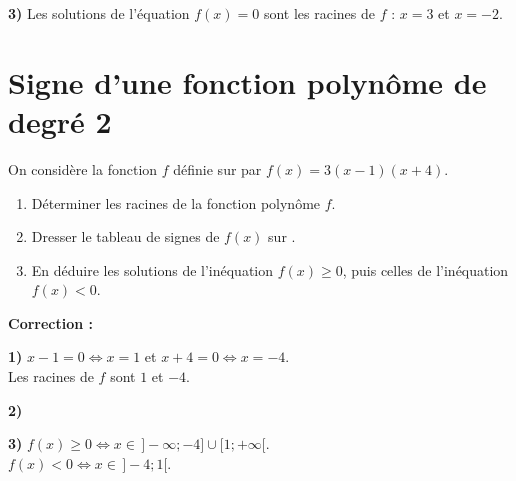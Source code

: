 \documentclass[11pt,a4paper]{book}
\begin{document}
\medskip
\begin{corrBox}
	\textbf{3)} Les solutions de l'équation $f(x)=0$ sont les racines de $f$ : $x=3$ et $x=-2$.
\end{corrBox}

\section*{\color{green!55!black}Signe d'une fonction polynôme de degré 2}

\exerciceDS{}

On considère la fonction $f$ définie sur \R par $f(x)=3(x-1)(x+4)$.

\begin{enumerate}[label=\textbf{\arabic*)}]
	\item Déterminer les racines de la fonction polynôme $f$.
	\item Dresser le tableau de signes de $f(x)$ sur \R.
	\item En déduire les solutions de l'inéquation $f(x)\geq 0$, puis celles de l'inéquation $f(x)<0$.
\end{enumerate}

\medskip
\noindent\textbf{\color{red!75!black}Correction :}

\smallskip
\begin{corrBox}
	\textbf{1)} $x-1=0 \iff x=1$ \quad et \quad $x+4=0 \iff x=-4$.\\
	Les racines de $f$ sont $1$ et $-4$.
\end{corrBox}

\medskip
\begin{corrBox}
	\textbf{2)}
	\begin{center}
	\end{center}
\end{corrBox}

\medskip
\begin{corrBox}
	\textbf{3)} $f(x)\geq0 \iff x\in\,]-\infty ; -4]\cup[1 ; +\infty[$.\\
	$f(x)<0 \iff x\in\,]-4 ; 1[$.
\end{corrBox}
\end{document}
